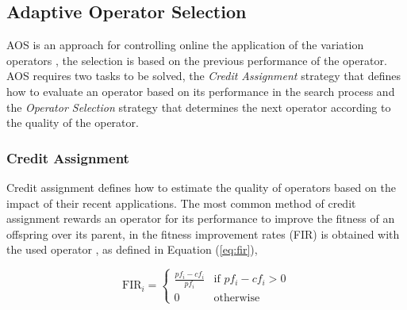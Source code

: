 \documentclass[journal]{IEEEtran}
\begin{document}
\subsection{Adaptive Operator Selection}
AOS is an approach for controlling online the application of the variation operators \cite{hitomi2016classification}, the selection is based on the previous performance of the operator.
AOS requires two tasks to be solved, the \textit{Credit Assignment} strategy that defines how to evaluate an operator based on its performance in the search process and the \textit{Operator Selection} strategy that determines the next operator according to the quality of the operator.

\subsubsection{Credit Assignment}
Credit assignment defines how to estimate the quality of operators based on the impact of their recent applications.
The most common method of credit assignment rewards an operator for its performance to improve the fitness of an offspring over its parent, in \cite{lin2016adaptive} the fitness improvement rates (FIR) is obtained with the used operator
, as defined in Equation (\ref{eq:fir}),

\begin{equation}
    \text{FIR}_{i}=\left\{
    \begin{array}{ll}
        \frac{pf_{i}-cf_{i}}{pf_{i}} & \text{if }pf_{i}-cf_{i}>0 \\

        0                            & \text{otherwise}
    \end{array}
    \right.
    \label{eq:fir}
\end{equation}
\end{document}
